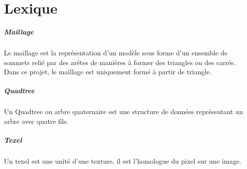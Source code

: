   \chapter*{Lexique}
    
    
    \paragraph{Maillage}\label{def:maillage} Le maillage est la représentation d'un modèle sous forme d'un ensemble de sommets relié par des arêtes de manières à former des triangles ou des carrés. Dans ce projet, le maillage est uniquement formé à partir de triangle.
    
    
    \paragraph{Quadtree}\label{def:quadtree} Un Quadtree ou arbre quaternaire est une structure de données représentant un arbre avec quatre fils.
    \paragraph{Texel}\label{def:texel} Un texel est une unité d'une texture, il est l'homologue du pixel sur une image.
